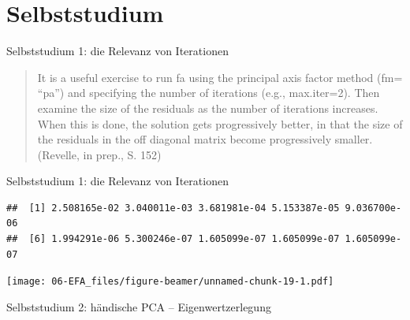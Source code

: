 \documentclass[
  ignorenonframetext,
]{beamer}
\newenvironment{Shaded}{\begin{snugshade}}{\end{snugshade}}
\newcommand{\AttributeTok}[1]{\textcolor[rgb]{0.77,0.63,0.00}{#1}}
\newcommand{\CommentTok}[1]{\textcolor[rgb]{0.56,0.35,0.01}{\textit{#1}}}
\newcommand{\ConstantTok}[1]{\textcolor[rgb]{0.00,0.00,0.00}{#1}}
\newcommand{\DecValTok}[1]{\textcolor[rgb]{0.00,0.00,0.81}{#1}}
\newcommand{\FunctionTok}[1]{\textcolor[rgb]{0.00,0.00,0.00}{#1}}
\newcommand{\NormalTok}[1]{#1}
\newcommand{\OtherTok}[1]{\textcolor[rgb]{0.56,0.35,0.01}{#1}}
\newcommand{\SpecialCharTok}[1]{\textcolor[rgb]{0.00,0.00,0.00}{#1}}
\begin{document}
\hypertarget{selbststudium}{%
\section*{Selbststudium}\label{selbststudium}}

\begin{frame}{Selbststudium 1: die Relevanz von Iterationen}
\protect\hypertarget{selbststudium-1-die-relevanz-von-iterationen}{}
\begin{quote}
It is a useful exercise to run fa using the principal axis factor method
(fm= ``pa'') and specifying the number of iterations (e.g., max.iter=2).
Then examine the size of the residuals as the number of iterations
increases. When this is done, the solution gets progressively better, in
that the size of the residuals in the off diagonal matrix become
progressively smaller. (Revelle, in prep., S. 152)
\end{quote}
\end{frame}

\begin{frame}[fragile]{Selbststudium 1: die Relevanz von Iterationen}
\protect\hypertarget{selbststudium-1-die-relevanz-von-iterationen-1}{}
\begin{verbatim}
##  [1] 2.508165e-02 3.040011e-03 3.681981e-04 5.153387e-05 9.036700e-06
##  [6] 1.994291e-06 5.300246e-07 1.605099e-07 1.605099e-07 1.605099e-07
\end{verbatim}

\texttt{[image: 06-EFA\_files/figure-beamer/unnamed-chunk-19-1.pdf]}
\end{frame}

\begin{frame}[fragile]{Selbststudium 2: händische PCA --
Eigenwertzerlegung}
\protect\hypertarget{selbststudium-2-huxe4ndische-pca-eigenwertzerlegung}{}
\begin{Shaded}
\end{Shaded}
\end{frame}
\end{document}
